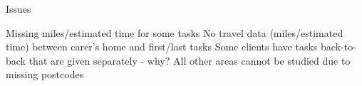\documentclass[usenames,dvipsnames]{beamer}
\begin{document}

\begin{frame}{Issues}
	\begin{itemize}
		\aitem Missing miles/estimated time for some tasks
		\aitem No travel data (miles/estimated time) between carer's home and first/last tasks
		\aitem Some clients have tasks back-to-back that are given separately - why?
		\aitem All other areas cannot be studied due to missing postcodes
	\end{itemize}
\end{frame}

\end{document}
